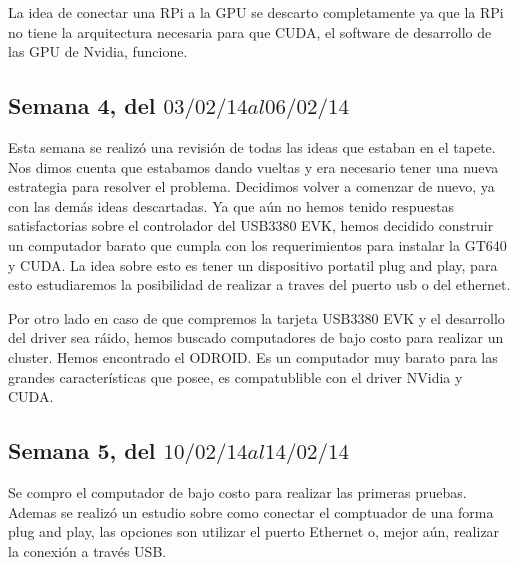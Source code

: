 \documentclass[11pt,oneside,titlepage]{article}
\begin{document}
La idea de conectar una RPi a la GPU se descarto completamente ya que la RPi no 
tiene la arquitectura necesaria para que CUDA, el software de desarrollo de las GPU de Nvidia, funcione.

\subsection*{Semana 4, del $03/02/14 al 06/02/14$}

Esta semana se realizó una revisión de todas las ideas que estaban en el
tapete. Nos dimos cuenta que estabamos dando vueltas y era necesario tener una
nueva estrategia para resolver el problema. Decidimos volver a comenzar de
nuevo, ya con las demás ideas descartadas. Ya que aún no hemos tenido
respuestas satisfactorias sobre el controlador del USB3380 EVK, hemos decidido
construir un computador barato que cumpla con los requerimientos para instalar
la GT640 y CUDA. La idea sobre esto es tener un dispositivo portatil plug and
play, para esto estudiaremos la posibilidad de realizar a traves del puerto usb
o del ethernet. 

Por otro lado en caso de que compremos la tarjeta USB3380 EVK y el desarrollo
del driver sea ráido, hemos buscado computadores de bajo costo para realizar un
cluster. Hemos encontrado el ODROID. Es un computador muy barato para las
grandes características que posee, es compatublible con el driver NVidia y
CUDA.

\subsection*{Semana 5, del $10/02/14 al 14/02/14$}

Se compro el computador de bajo costo para realizar las primeras pruebas.
Ademas se realizó un estudio sobre como conectar el comptuador de una forma plug
and play, las opciones son utilizar el puerto Ethernet o, mejor aún, realizar la
conexión a trav\'es USB.
\end{document}
